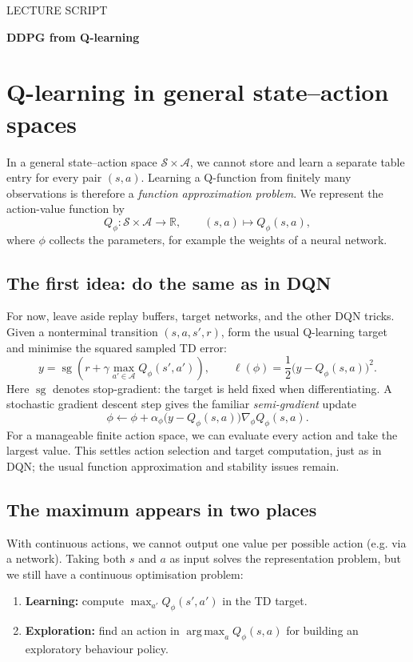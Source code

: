 \documentclass[11pt,a4paper]{article}
\newcommand{\sg}{\operatorname{sg}}
\DeclareMathOperator*{\argmax}{arg\,max}
\begin{document}
{\sffamily\color{accent}\small LECTURE SCRIPT\par}
{\sffamily\bfseries\color{ink}\fontsize{27}{31}\selectfont DDPG from Q-learning\par}
\vspace{9pt}

\section{Q-learning in general state--action spaces}
In a general state--action space $\mathcal S\times\mathcal A$, we cannot store
and learn a separate table entry for every pair $(s,a)$. Learning a Q-function
from finitely many observations is therefore a \emph{function approximation
problem}. We represent the action-value function by
\begin{equation}
 Q_\phi:\mathcal S\times\mathcal A\longrightarrow\mathbb R,
 \qquad (s,a)\longmapsto Q_\phi(s,a),
\end{equation}
where $\phi$ collects the parameters, for example the weights of a neural network.

\subsection{The first idea: do the same as in DQN}
For now, leave aside replay buffers, target networks, and the other DQN tricks.
Given a nonterminal transition $(s,a,s',r)$, form the usual Q-learning target
and minimise the squared sampled TD error:
\begin{equation}\label{eq:naive-loss}
 y=\sg\!\left(r+\gamma\max_{a'\in\mathcal A}Q_\phi(s',a')\right),
 \qquad \ell(\phi)=\frac12\bigl(y-Q_\phi(s,a)\bigr)^2.
\end{equation}
Here $\sg$ denotes stop-gradient: the target is held fixed when differentiating.
A stochastic gradient descent step gives the familiar \emph{semi-gradient} update
\begin{equation}\label{eq:naive-ql}
 \phi\leftarrow\phi+\alpha_\phi
 \bigl(y-Q_\phi(s,a)\bigr)\nabla_\phi Q_\phi(s,a).
\end{equation}
For a manageable finite action space, we can evaluate every action and take
the largest value. This settles action selection and target computation,
just as in DQN; the usual function approximation and stability issues remain.

\subsection{The maximum appears in two places}
With continuous actions, we cannot output one value per possible
action (e.g. via a network). Taking both $s$ and $a$ as input solves the representation problem,
but we still have a continuous optimisation problem:
\begin{enumerate}
 \item \textbf{Learning:} compute $\max_{a'}Q_\phi(s',a')$ in the TD target.
 \item \textbf{Exploration:} find an action in $\argmax_a Q_\phi(s,a)$ for building an exploratory behaviour policy.
\end{enumerate}
\end{document}
